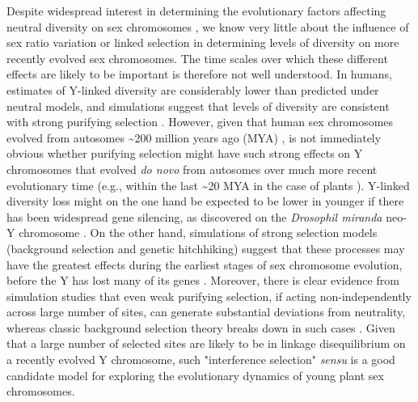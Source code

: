 \documentclass[9pt,twocolumn,twoside]{gsajnl}
\begin{document}
Despite widespread interest in determining the evolutionary factors affecting neutral diversity on sex chromosomes \citep{ellegren2011,bachtrog2013NRG}, we know very little about the influence of sex ratio variation or linked selection in determining levels of diversity on more recently evolved sex chromosomes. The time scales over which these different effects are likely to be important is therefore not well understood. In humans, estimates of Y-linked diversity are considerably lower than predicted under neutral models, and simulations suggest that levels of diversity are consistent with strong purifying selection \citep{Wilsonsayres2014}. However, given that human sex chromosomes evolved from autosomes \textasciitilde 200 million years ago (MYA) \citep{lahn1999four,ross2005dna}, is not immediately obvious whether purifying selection might have such strong effects on Y chromosomes that evolved \textit{do novo} from autosomes over much more recent evolutionary time (e.g., within the last \textasciitilde 20 MYA in the case of plants \citep{charlesworth2015plant}). Y-linked diversity loss might on the one hand be expected to be lower in younger if there has been widespread gene silencing, as discovered on the \textit{Drosophil miranda} neo-Y chromosome \citep{zhou2012chromosome}. On the other hand, simulations of strong selection models (background selection and genetic hitchhiking) suggest that these processes may have the greatest effects during the earliest stages of sex chromosome evolution, before the Y has lost many of its genes \citep{bachtrog2008temporal}. Moreover, there is clear evidence from simulation studies that even weak purifying selection, if acting non-independently across large number of sites, can generate substantial deviations from neutrality, whereas classic background selection theory breaks down in such cases \citep{mcvean2000, comeron2002population, KaiserCharlesworth, good2014genetic}. Given that a large number of selected sites are likely to be in linkage disequilibrium on a recently evolved Y chromosome, such "interference selection" \textit{sensu} \citep{good2014genetic} is a good candidate model for exploring the evolutionary dynamics of young plant sex chromosomes.
\end{document}

